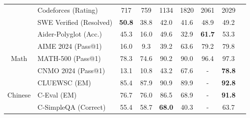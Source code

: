 \begin{table}[h]
\begin{tabular}{@{}c l | c  c  c | c c |c c @{}}
    & Codeforces {\tiny (Rating)}& 717 & 759 & 1134 & 1820 & 2061 & 2029  \\
    & SWE Verified {\tiny (Resolved)} & \textbf{50.8}&38.8&42.0 & 41.6 & 48.9 & 49.2 \\
    & Aider-Polyglot {\tiny (Acc.)} & 45.3&16.0& 49.6 & 32.9 & \textbf{61.7}&53.3 \\
    \midrule
    \multirow{3}{*}{Math} & AIME 2024 {\tiny (Pass@1)}  & 16.0 & 9.3 & 39.2 & 63.6 & 79.2 & 79.8  \\
    & MATH-500 {\tiny (Pass@1)} &78.3 & 74.6&90.2 & 90.0 & 96.4 & 97.3 \\
    & CNMO 2024 {\tiny (Pass@1)} & 13.1 & 10.8 &43.2 & 67.6 & - & \textbf{78.8} \\
    \midrule
    \multirow{3}{*}{Chinese} & CLUEWSC {\tiny (EM)}&  85.4 & 87.9 & 90.9 & 89.9 & -  &\textbf{92.8} \\
    & C-Eval {\tiny (EM)} & 76.7 & 76.0 & 86.5 & 68.9 & - & \textbf{91.8} \\
     & C-SimpleQA {\tiny (Correct)}  & 55.4 & 58.7 & \textbf{68.0} & 40.3 & -& 63.7 \\
    \bottomrule
    \end{tabular}
    
    \label{tab:main}
\end{table}
